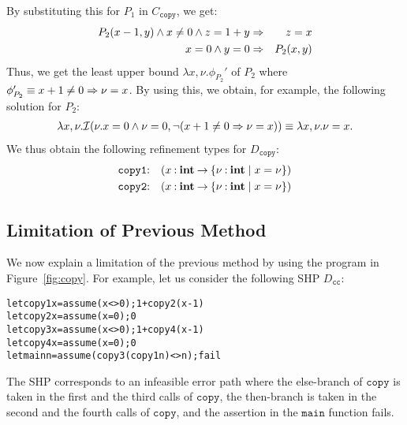 By substituting this for \(P_1\) in \(C_{\texttt{copy}}\), we get:
\begin{eqnarray*}
P_2(x-1,y) \land x\neq0 \land z=1+y &\Rightarrow& z=x \\
x=0 \land y=0 &\Rightarrow& P_2(x,y)
\end{eqnarray*}
Thus, we get the least upper bound \(\lambda x,\nu. \phi_{P_2}'\) of 
\(P_2\) where \(\phi_{P_2}' \equiv x+1\neq0 \Rightarrow \nu=x\).  By using 
this, we obtain, for example, the following solution for \(P_2\):
\begin{eqnarray*}
\lambda x,\nu.\mathcal{I}(\nu.x=0 \land \nu=0,\neg (x+1\neq0 \Rightarrow \nu=x)) \equiv \lambda x,\nu.\nu=x.
\end{eqnarray*}
We thus obtain the following refinement types for \(D_{\texttt{copy}}\):
\begin{eqnarray*}
\texttt{copy1}&\mathbin{:}&(x\mathbin{:}{\mathbf{int}}\mathbin{\rightarrow}{\{{\nu\mathbin{:}\mathbf{int} \mid x=\nu}\}}) \\
\texttt{copy2}&\mathbin{:}&(x\mathbin{:}{\mathbf{int}}\mathbin{\rightarrow}{\{{\nu\mathbin{:}\mathbf{int} \mid x=\nu}\}})
\end{eqnarray*}

\subsection{Limitation of Previous Method}
\label{sec:limit}

We now explain a limitation of the previous method by using the program 
in Figure~\ref{fig:copy}.  For example, let us consider the following 
SHP \(D_{\texttt{cc}}\):
\begin{alltt}
let copy1 x = assume (x<>0); 1 + copy2 (x-1)
let copy2 x = assume (x=0); 0
let copy3 x = assume (x<>0); 1 + copy4 (x-1)
let copy4 x = assume (x=0); 0
let main n = assume (copy3 (copy1 n) <> n); fail
\end{alltt}
The SHP corresponds to an infeasible error path where the else-branch of 
\(\texttt{copy}\) is taken in the first and the third calls of 
\(\texttt{copy}\), the then-branch is taken in the second and the fourth 
calls of \(\texttt{copy}\), and the assertion in the \(\texttt{main}\) 
function fails.


